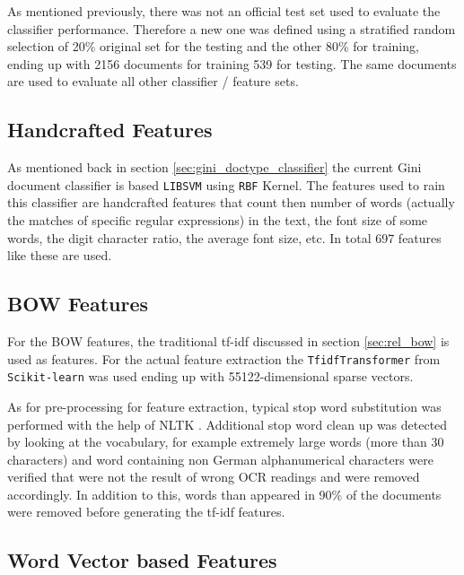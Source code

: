 As  mentioned previously, there was not an official test set used to
evaluate the classifier performance. Therefore a new one was defined using a
stratified random selection of 20\% original  set for the testing and the
other 80\% for training, ending up with 2156 documents for training  539 for
testing. The same documents are used to evaluate all other classifier /
feature sets.


\subsection{Handcrafted Features}
\label{sec:sub_w2v4tc_current_features}

As mentioned back in section  \ref{sec:gini_doctype_classifier} the current
Gini document classifier is based  \texttt{LIBSVM} \cite{CC01a} using 
\texttt{RBF} Kernel.   The features used to rain this classifier are
handcrafted features that count then number of words (actually the matches of
specific regular expressions) in the text, the font size of some
words, the digit character ratio, the average font size, etc. In total 697 features like these are used.
 


\subsection{\ac{BOW} Features}
\label{sec:sub_w2v4tc_bow_features}

For the \ac{BOW} features, the traditional \ac{tf-idf}  
\cite{Salton88term-weightingapproaches, Sebastiani02} discussed in
section \ref{sec:rel_bow} is used as features. For the actual feature
extraction the \texttt{TfidfTransformer} from \texttt{Scikit-learn} 
\cite{scikit-learn}  was used ending up with 55122-dimensional sparse
vectors.

As for  pre-processing for feature extraction,  typical stop word substitution was performed with the help
of \ac{NLTK} \cite{BirdKleinLoper09}. Additional stop word clean up was
detected by looking at the vocabulary, for example extremely large words
(more than 30 characters) and word containing non German alphanumerical
characters were verified that were not the result of wrong OCR
readings and were removed accordingly. In addition to this, words than
appeared in 90\% of the documents were removed  before generating the \ac{tf-idf}
features.


\subsection{Word Vector  based Features}
\label{sec:sub_w2v4tc_w2v_based_features}

